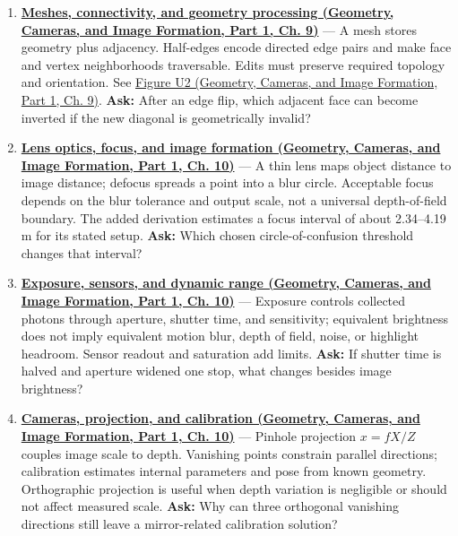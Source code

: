 \begin{enumerate}
\item
  \textbf{\href{../03-Geometry-Cameras-and-Image-Formation-P01/main.pdf\#nameddest=03-visual-computing-i-ch002-meshes-connectivity-and-geometry-processing}{Meshes, connectivity, and geometry processing (Geometry, Cameras, and Image Formation, Part 1, Ch. 9)}} --- A mesh stores geometry plus adjacency. Half-edges encode directed edge pairs and make face and vertex neighborhoods traversable. Edits must preserve required topology and orientation. See \href{../03-Geometry-Cameras-and-Image-Formation-P01/main.pdf\#nameddest=03-visual-computing-i-ch002-figure-u2---a-half-edge-separates-face-traversal-from-edge-traversal}{Figure U2 (Geometry, Cameras, and Image Formation, Part 1, Ch. 9)}. \textbf{Ask:} After an edge flip, which adjacent face can become inverted if the new diagonal is geometrically invalid?
\item
  \textbf{\href{../03-Geometry-Cameras-and-Image-Formation-P01/main.pdf\#nameddest=03-visual-computing-i-ch003-lens-optics-focus-and-image-formation}{Lens optics, focus, and image formation (Geometry, Cameras, and Image Formation, Part 1, Ch. 10)}} --- A thin lens maps object distance to image distance; defocus spreads a point into a blur circle. Acceptable focus depends on the blur tolerance and output scale, not a universal depth-of-field boundary. The added derivation estimates a focus interval of about 2.34--4.19 m for its stated setup. \textbf{Ask:} Which chosen circle-of-confusion threshold changes that interval?
\item
  \textbf{\href{../03-Geometry-Cameras-and-Image-Formation-P01/main.pdf\#nameddest=03-visual-computing-i-ch003-exposure-sensors-and-dynamic-range}{Exposure, sensors, and dynamic range (Geometry, Cameras, and Image Formation, Part 1, Ch. 10)}} --- Exposure controls collected photons through aperture, shutter time, and sensitivity; equivalent brightness does not imply equivalent motion blur, depth of field, noise, or highlight headroom. Sensor readout and saturation add limits. \textbf{Ask:} If shutter time is halved and aperture widened one stop, what changes besides image brightness?
\item
  \textbf{\href{../03-Geometry-Cameras-and-Image-Formation-P01/main.pdf\#nameddest=03-visual-computing-i-ch003-cameras-projection-and-calibration}{Cameras, projection, and calibration (Geometry, Cameras, and Image Formation, Part 1, Ch. 10)}} --- Pinhole projection \(x=fX/Z\) couples image scale to depth. Vanishing points constrain parallel directions; calibration estimates internal parameters and pose from known geometry. Orthographic projection is useful when depth variation is negligible or should not affect measured scale. \textbf{Ask:} Why can three orthogonal vanishing directions still leave a mirror-related calibration solution?

\end{enumerate}
